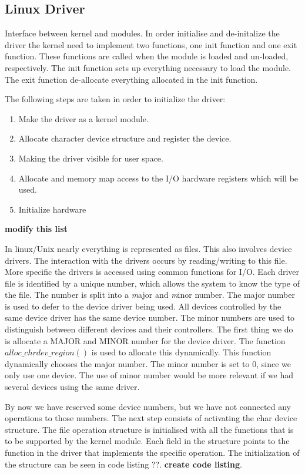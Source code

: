 \subsection{Linux Driver}
Interface between kernel and modules. In order initialise and de-initalize the driver the kernel need to implement two functions, one init function and one exit function. These functions are called when the module is loaded and un-loaded, respectively. The init function sets up everything necessary to load the module. The exit function de-allocate everything allocated in the init function. 

The following steps are taken in order to initialize the driver:

\begin{enumerate}
    \item Make the driver as a kernel module.
    \item Allocate character device structure and register the device. 
    \item Making the driver visible for user space.
    \item Allocate and memory map access to the I/O hardware registers which will be used. 
    \item Initialize hardware
\end{enumerate}

{\bf modify this list}

In linux/Unix nearly everything is represented as files. This also involves device drivers. The interaction with the drivers occurs by reading/writing to this file. More specific the drivers is accessed  using common functions for I/O. Each driver file is identified by a unique number, which allows the system to know the type of the file. The number is split into a \emph major and \emph minor number. The major number is used to defer to the device driver being used. All devices controlled by the same device driver has the same device number. The minor numbers are used to distinguish between different devices and their controllers. The first thing we do is allocate a MAJOR and MINOR number for the device driver. The function $alloc\_chrdev\_region()$ is used to allocate this dynamically. This function dynamically chooses the major number. The minor number is set to 0, since we only use one device. The use of minor number would be more relevant if we had several devices using the same driver. 

By now we have reserved some device numbers, but we have not connected any operations to those numbers. The next step consists of activating the char device structure. The file operation structure is initialised with all the functions that is to be supported by the kernel module. Each field in the structure points to the function in the driver that implements the specific operation. The initialization of the structure can be seen in code listing ??. {\bf create code listing}.


